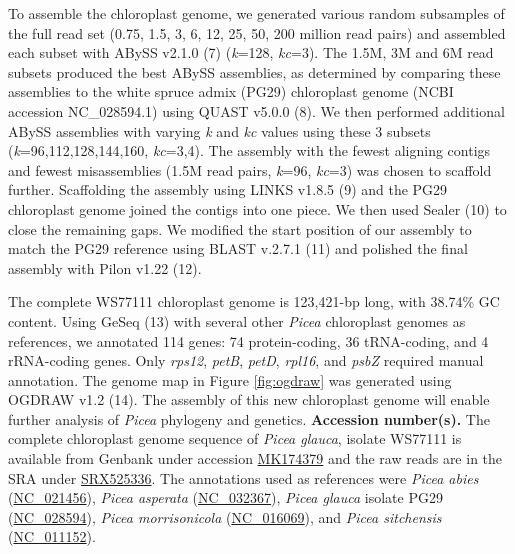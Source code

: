 \documentclass[titlepage,11pt, oneside]{article}   	%
\begin{document}
To assemble the chloroplast genome, we generated various random subsamples of the full read set (0.75, 1.5, 3, 6, 12, 25, 50, 200 million read pairs) and assembled each subset with ABySS v2.1.0 (7) (\textit{k}=128, \textit{kc}=3). The 1.5M, 3M and 6M read subsets produced the best ABySS assemblies, as determined by comparing these assemblies to the white spruce admix (PG29) chloroplast genome (NCBI accession NC\_028594.1) using QUAST v5.0.0 (8). We then performed additional ABySS assemblies with varying \textit{k} and \textit{kc} values using these 3 subsets (\textit{k}=96,112,128,144,160, \textit{kc}=3,4). The assembly with the fewest aligning contigs and fewest misassemblies (1.5M read pairs, \textit{k}=96, \textit{kc}=3) was chosen to scaffold further. Scaffolding the assembly using LINKS v1.8.5 (9) and the PG29 chloroplast genome joined the contigs into one piece. We then used Sealer (10) to close the remaining gaps. We modified the start position of our assembly to match the PG29 reference using BLAST v.2.7.1 (11) and polished the final assembly with Pilon v1.22 (12).
\newline
\par
The complete WS77111 chloroplast genome is 123,421-bp long, with 38.74\% GC content. Using GeSeq (13) with several other \textit{Picea} chloroplast genomes as references, we annotated 114 genes: 74 protein-coding, 36 tRNA-coding, and 4 rRNA-coding genes. Only \textit{rps12}, \textit{petB}, \textit{petD}, \textit{rpl16}, and \textit{psbZ} required manual annotation. The genome map in Figure \ref{fig:ogdraw} was generated using OGDRAW v1.2 (14). The assembly of this new chloroplast genome will enable further analysis of \textit{Picea} phylogeny and genetics.
\newline
\newline
\textbf{Accession number(s).} The complete chloroplast genome sequence of \textit{Picea glauca}, isolate WS77111 is available from Genbank under accession \href{https://www.ncbi.nlm.nih.gov/nuccore/MK174379}{MK174379} and the raw reads are in the SRA under \href{https://www.ncbi.nlm.nih.gov/sra/SRX525336}{SRX525336}. The annotations used as references were \textit{Picea abies} (\href{https://www.ncbi.nlm.nih.gov/nuccore/NC_021456}{NC\_021456}), \textit{Picea asperata} (\href{https://www.ncbi.nlm.nih.gov/nuccore/NC_032367}{NC\_032367}), \textit{Picea glauca} isolate PG29 (\href{https://www.ncbi.nlm.nih.gov/nuccore/NC_028594}{NC\_028594}), \textit{Picea morrisonicola} (\href{https://www.ncbi.nlm.nih.gov/nuccore/NC_016069}{NC\_016069}), and \textit{Picea sitchensis }(\href{https://www.ncbi.nlm.nih.gov/nuccore/NC_011152}{NC\_011152}).
\end{document}
